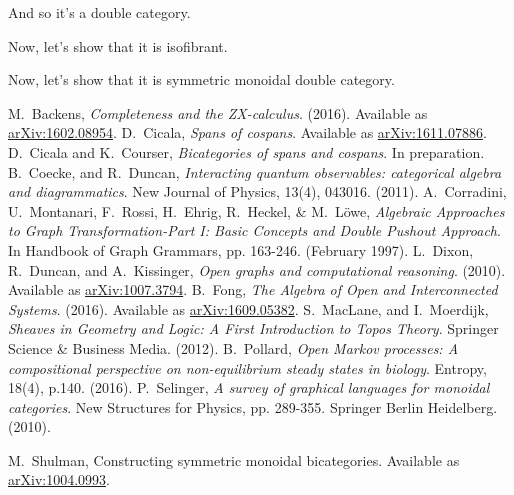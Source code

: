 \documentclass[11pt]{amsart}
\theoremstyle{remark}
\theoremstyle{definition}
\begin{document}
{And so it's a double category.

Now, let's show that it is isofibrant.  

Now, let's show that it is symmetric monoidal double category.  
}
 

























%
%

\begin{thebibliography}{100}	
%
M.~Backens, \emph{Completeness and the ZX-calculus}. (2016). Available as \href{https://arxiv.org/abs/1602.08954}{arXiv:1602.08954}.
%
D.~Cicala, 
\textit{Spans of cospans}.
Available as \href{https://arxiv.org/abs/1611.07886}{arXiv:1611.07886}.
%
D.~Cicala and K.~Courser,
\textit{Bicategories of spans and cospans}.
In preparation.
%
B.~Coecke, and R.~Duncan, \emph{Interacting quantum observables: categorical algebra and diagrammatics}. New Journal of Physics, 13(4), 043016. (2011).
%
A.~Corradini, U.~Montanari, F.~Rossi, H.~Ehrig, R.~Heckel, \& M.~L\"{o}we, 
\textit{Algebraic Approaches to Graph Transformation-Part I: Basic Concepts and Double Pushout Approach}. In Handbook of Graph Grammars, pp. 163-246. (February 1997).
%
L.~Dixon, R.~Duncan, and A.~Kissinger, \emph{Open graphs and computational reasoning}. (2010). Available as \href{https://arxiv.org/abs/1007.3794}{arXiv:1007.3794}.
%
B.~Fong, \emph{The Algebra of Open and Interconnected Systems}. (2016). Available as \href{https://arxiv.org/abs/arXiv:1609.05382}{arXiv:1609.05382}. 
%
S.~MacLane, and I.~Moerdijk, \emph{Sheaves in Geometry and Logic: A First Introduction to Topos Theory}. Springer Science \& Business Media. (2012).
%
B.~Pollard, \emph{Open Markov processes: A compositional perspective on non-equilibrium steady states in biology}. Entropy, 18(4), p.140. (2016).
%
P.~Selinger, \emph{A survey of graphical languages for monoidal categories}. New Structures for Physics, pp. 289-355. Springer Berlin Heidelberg. (2010).

M.~Shulman, 
Constructing symmetric monoidal bicategories. 
Available as \href{http://arxiv.org/abs/1004.0993}{arXiv:1004.0993}.
%
\end{thebibliography}
\end{document}
